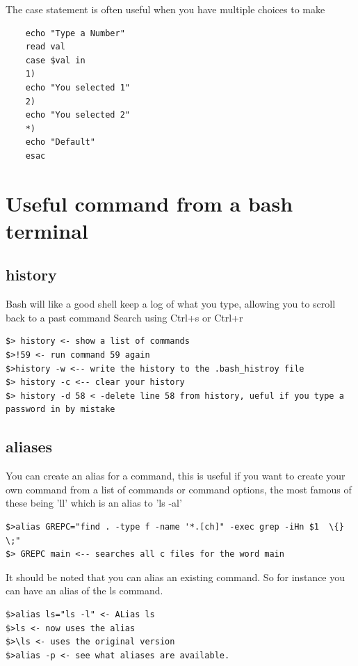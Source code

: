 \documentclass[22pt] {article}
\begin{document}
The case statement is often useful when you 
have multiple choices to make

	\begin{lstlisting}
	echo "Type a Number"
	read val
	case $val in
	1)
	echo "You selected 1"
	2)
	echo "You selected 2"
	*)
	echo "Default"
	esac
\end{lstlisting}
	 
\section{Useful command from a bash terminal}

\subsection{history}
Bash will like a good shell keep a log of what you type, allowing you to scroll back to a  past command
Search using Ctrl+s or Ctrl+r

\begin{lstlisting}
$> history <- show a list of commands
$>!59 <- run command 59 again
$>history -w <-- write the history to the .bash_histroy file
$> history -c <-- clear your history
$> history -d 58 < -delete line 58 from history, ueful if you type a password in by mistake
\end{lstlisting}

\subsection{aliases} 
You can create an alias for a command, this is useful if you want to create your own command from
a list of commands or command options, the most famous of these being 'll' which is an alias to 'ls -al'
\begin{lstlisting}
$>alias GREPC="find . -type f -name '*.[ch]" -exec grep -iHn $1  \{} \;"
$> GREPC main <-- searches all c files for the word main
\end{lstlisting}

It should be noted that you can alias an existing command. So for instance you can have an alias of the ls command.
\begin{lstlisting}
$>alias ls="ls -l" <- ALias ls
$>ls <- now uses the alias
$>\ls <- uses the original version
$>alias -p <- see what aliases are available.
\end{lstlisting}
\end{document}
